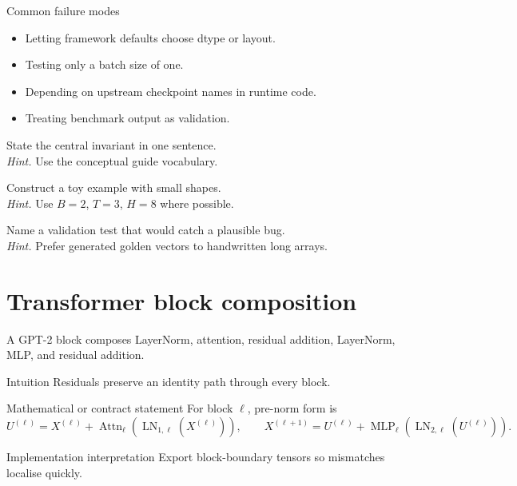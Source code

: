 \begin{warningbox}{Common failure modes}
\begin{itemize}
\item Letting framework defaults choose dtype or layout.
\item Testing only a batch size of one.
\item Depending on upstream checkpoint names in runtime code.
\item Treating benchmark output as validation.
\end{itemize}
\end{warningbox}

\begin{chapterexercises}
\item State the central invariant in one sentence.\\
\textit{Hint.} Use the conceptual guide vocabulary.
\item Construct a toy example with small shapes.\\
\textit{Hint.} Use $B=2$, $T=3$, $H=8$ where possible.
\item Name a validation test that would catch a plausible bug.\\
\textit{Hint.} Prefer generated golden vectors to handwritten long arrays.
\end{chapterexercises}

\chapter{Transformer block composition}
\label{ch:block-composition}
A GPT-2 block composes LayerNorm, attention, residual addition, LayerNorm, MLP, and residual addition.



\begin{intuitionbox}{Intuition}
Residuals preserve an identity path through every block.
\end{intuitionbox}

\begin{definitionbox}{Mathematical or contract statement}
For block \(\ell\), pre-norm form is
\[
U^{(\ell)}=X^{(\ell)}+\operatorname{Attn}_{\ell}(\operatorname{LN}_{1,\ell}(X^{(\ell)})),
\qquad
X^{(\ell+1)}=U^{(\ell)}+\operatorname{MLP}_{\ell}(\operatorname{LN}_{2,\ell}(U^{(\ell)})).
\]
\end{definitionbox}

\begin{implementationbox}{Implementation interpretation}
Export block-boundary tensors so mismatches localise quickly.
\end{implementationbox}

